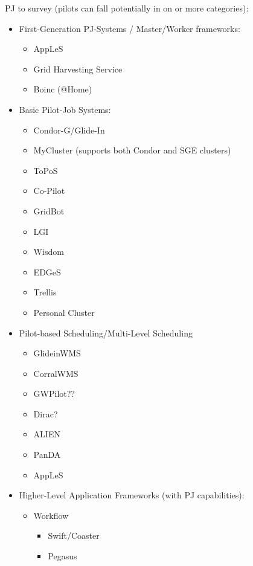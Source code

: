 \documentclass{sig-alternate}
\begin{document}
PJ to survey (pilots can fall potentially in on or more categories):
\begin{itemize}
	\item First-Generation PJ-Systems / Master/Worker frameworks:
	\begin{itemize}
		\item AppLeS
		\item Grid Harvesting Service
		\item Boinc (@Home)
	\end{itemize}
	\item Basic Pilot-Job Systems: 
	\begin{itemize}
		\item Condor-G/Glide-In
		\item MyCluster (supports both Condor and SGE clusters)
		\item ToPoS 
		\item Co-Pilot
		\item GridBot~\cite{Silberstein:2009:GEB:1654059.1654071}
		\item LGI
		\item Wisdom
		\item EDGeS
		\item Trellis
		\item Personal Cluster
	\end{itemize}
	\item Pilot-based Scheduling/Multi-Level Scheduling
	\begin{itemize}
		\item GlideinWMS~\cite{1742-6596-119-6-062044}
		\item CorralWMS
		\item GWPilot??~\cite{gridway} 
		\item Dirac?
        \item ALIEN
		\item PanDA  
		\item AppLeS
	\end{itemize}
	\item Higher-Level Application Frameworks (with PJ capabilities):
	\begin{itemize}
		\item Workflow
		\begin{itemize}
			\item Swift/Coaster
			\item Pegasus

\end{itemize}
\end{itemize}
\end{itemize}
\end{document}
